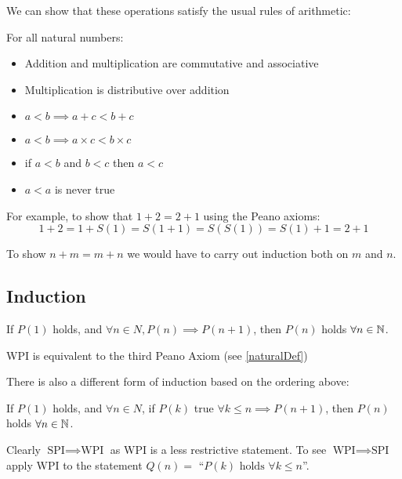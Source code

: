 \documentclass[../main.tex]{subfiles}
\begin{document}
We can show that these operations satisfy the usual rules of arithmetic:
\begin{proposition}
For all natural numbers:
  \begin{itemize}
    \item Addition and multiplication are commutative and associative
    \item Multiplication is distributive over addition
    \item $a < b \implies a + c < b + c$
    \item $a < b \implies a \times c < b \times c$
    \item if $a < b$ and $b < c$ then $a < c$
    \item $a < a$ is never true
  \end{itemize}
\end{proposition}
\begin{example}
  For example, to show that $1 + 2 = 2 + 1$ using the Peano axioms:
  \[
    1 + 2 = 1 + S(1) = S(1 + 1) = S(S(1)) = S(1) + 1 = 2 + 1
  \]
\end{example}
\begin{example}
  To show $n + m = m + n$ we would have to carry out induction both on $m$ and $n$.
\end{example}

\subsection{Induction}
\begin{definition}
  If $P(1)$ holds, and $\forall n \in N, P(n) \implies P(n + 1)$, then $P(n)$ holds $\forall n \in \mathbb{N}$.
\end{definition}
\begin{remark}[Note]
  WPI is equivalent to the third Peano Axiom (see \cref{naturalDef})
\end{remark}
There is also a different form of induction based on the ordering above:
\begin{definition}
  If $P(1)$ holds, and $\forall n \in N$, if $P(k)$ true $\forall k \leq n \implies P(n + 1)$, then $P(n)$ holds $\forall n \in \mathbb{N}$.
\end{definition}
Clearly $\text{SPI} \implies \text{WPI}$ as WPI is a less restrictive statement.
To see $\text{WPI} \implies \text{SPI}$ apply WPI to the statement $Q(n) =$ ``$P(k) \text{ holds } \forall k \leq n$''.
\end{document}
